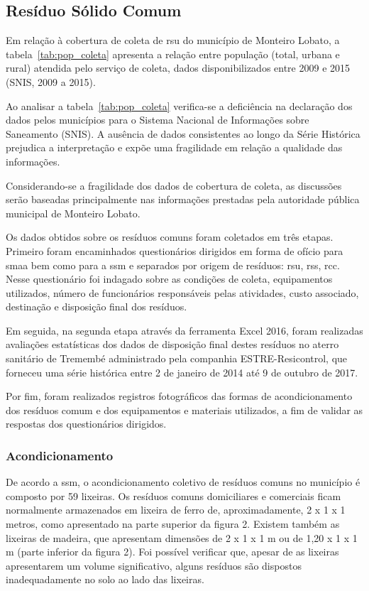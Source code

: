 	\subsection{Resíduo Sólido Comum}
	
	Em relação à cobertura de coleta de \gls{rsu} do município de Monteiro Lobato, a tabela~\ref{tab:pop_coleta} apresenta a relação entre população (total, urbana e rural) atendida pelo serviço de coleta, dados disponibilizados entre 2009 e 2015 (SNIS, 2009 a 2015).
	
%	
	
	Ao analisar a tabela~\ref{tab:pop_coleta} verifica-se a deficiência na declaração dos dados pelos municípios para o Sistema Nacional de Informações sobre Saneamento (SNIS). A ausência de dados consistentes ao longo da Série Histórica prejudica a interpretação e expõe uma fragilidade em relação a qualidade das informações.
	
	Considerando-se a fragilidade dos dados de cobertura de coleta, as discussões serão baseadas principalmente nas informações prestadas pela autoridade pública municipal de Monteiro Lobato.
	
	Os dados obtidos sobre os resíduos comuns foram coletados em três etapas. Primeiro foram encaminhados questionários dirigidos em forma de ofício para \gls{smaa} bem como para a \gls{ssm} e separados por origem de resíduos: \gls{rsu}, \gls{rss}, \gls{rcc}. Nesse questionário foi indagado sobre as condições de coleta, equipamentos utilizados, número de funcionários responsáveis pelas atividades, custo associado, destinação e disposição final dos resíduos.
	
	Em seguida, na segunda etapa através da ferramenta Excel 2016, foram realizadas avaliações estatísticas dos dados de disposição final destes resíduos no aterro sanitário de Tremembé administrado pela companhia ESTRE-Resicontrol, que forneceu uma série histórica entre 2 de janeiro de 2014 até 9 de outubro de 2017.
	
	Por fim, foram realizados registros fotográficos das formas de acondicionamento dos resíduos comum e dos equipamentos e materiais utilizados, a fim de validar as respostas dos questionários dirigidos.
	
	\subsubsection{Acondicionamento}
	
	De acordo a \gls{ssm}, o acondicionamento coletivo de resíduos comuns no município é composto por 59 lixeiras. Os resíduos comuns domiciliares e comerciais ficam normalmente armazenados em lixeira de ferro de, aproximadamente, 2 x 1 x 1 metros, como apresentado na parte superior da figura 2. Existem também as lixeiras de madeira, que apresentam dimensões de 2 x 1 x 1 m ou de 1,20 x 1 x 1 m (parte inferior da figura 2). Foi possível verificar que, apesar de as lixeiras apresentarem um volume significativo, alguns resíduos são dispostos inadequadamente no solo ao lado das lixeiras. 
	

